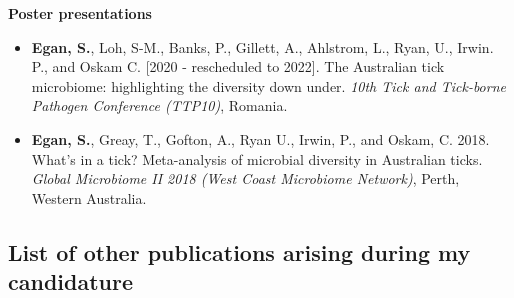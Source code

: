 \documentclass[a4paper, nobind]{templates/ociamthesis}
\providecommand{\tightlist}{%
  \setlength{\itemsep}{0pt}\setlength{\parskip}{0pt}}
\begin{document}
\textbf{Poster presentations}

\begin{itemize}
\tightlist
\item
  \textbf{Egan, S.}, Loh, S-M., Banks, P., Gillett, A., Ahlstrom, L., Ryan, U., Irwin. P., and Oskam C. {[}2020 - rescheduled to 2022{]}. The Australian tick microbiome: highlighting the diversity down under. \emph{10th Tick and Tick-borne Pathogen Conference (TTP10)}, Romania.
\item
  \textbf{Egan, S.}, Greay, T., Gofton, A., Ryan U., Irwin, P., and Oskam, C. 2018. What's in a tick? Meta-analysis of microbial diversity in Australian ticks. \emph{Global Microbiome II 2018 (West Coast Microbiome Network)}, Perth, Western Australia.
\end{itemize}

\hypertarget{list-of-other-publications-arising-during-my-candidature}{%
\subsection*{List of other publications arising during my candidature}\label{list-of-other-publications-arising-during-my-candidature}}
\end{document}
